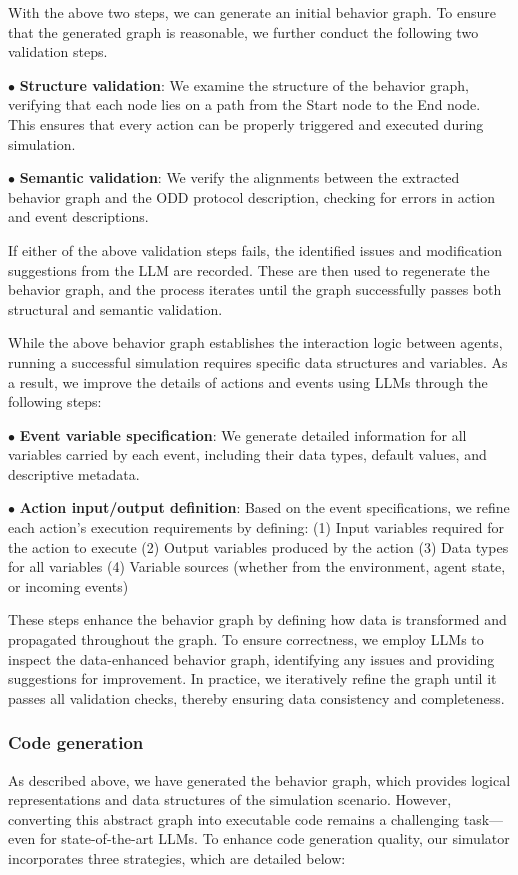 \documentclass{article}
\theoremstyle{definition}
\theoremstyle{theorem}
\theoremstyle{proof}
\theoremstyle{remark}
\begin{document}
    With the above two steps, we can generate an initial behavior graph. To ensure that the generated graph is reasonable, we further conduct the following two validation steps.
    
    $\bullet$ \textbf{Structure validation}: We examine the structure of the behavior graph, verifying that each node lies on a path from the Start node to the End node. This ensures that every action can be properly triggered and executed during simulation.
    
    $\bullet$ \textbf{Semantic validation}: We verify the alignments between the extracted behavior graph and the ODD protocol description, checking for errors in action and event descriptions.

    If either of the above validation steps fails, the identified issues and modification suggestions from the LLM are recorded. These are then used to regenerate the behavior graph, and the process iterates until the graph successfully passes both structural and semantic validation.


    While the above behavior graph establishes the interaction logic between agents, running a successful simulation requires specific data structures and variables. As a result, we improve the details of actions and events using LLMs through the following steps:
    
    $\bullet$ \textbf{Event variable specification}: We generate detailed information for all variables carried by each event, including their data types, default values, and descriptive metadata.
    
    $\bullet$ \textbf{Action input/output definition}: Based on the event specifications, we refine each action's execution requirements by defining:
    (1) Input variables required for the action to execute
    (2) Output variables produced by the action
    (3) Data types for all variables
    (4) Variable sources (whether from the environment, agent state, or incoming events)


    These steps enhance the behavior graph by defining how data is transformed and propagated throughout the graph. To ensure correctness, we employ LLMs to inspect the data-enhanced behavior graph, identifying any issues and providing suggestions for improvement. In practice, we iteratively refine the graph until it passes all validation checks, thereby ensuring data consistency and completeness.



    \subsubsection{Code generation}
    As described above, we have generated the behavior graph, which provides logical representations and data structures of the simulation scenario. However, converting this abstract graph into executable code remains a challenging task—even for state-of-the-art LLMs. To enhance code generation quality, our simulator incorporates three strategies, which are detailed below:
    
\end{document}
